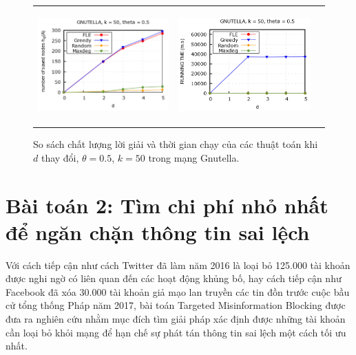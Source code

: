 \begin{figure}[H]
	\begin{tabular}{lll}
		\includegraphics[height = 4.4cm]{picture/FLE/gnu_res_d} &
		\includegraphics[height = 4.4cm]{picture/FLE/gnu_time_d}
	\end{tabular}
	\caption{So sách chất lượng lời giải và thời gian chạy của các thuật toán khi $d$ thay đổi, $\theta=0.5$, $k=50$ trong mạng Gnutella.} 
	\label{fig:FLE_d}   
\end{figure} 







\section{Bài toán 2: Tìm chi phí nhỏ nhất để ngăn chặn thông tin sai lệch}

Với cách tiếp cận như cách Twitter đã làm năm 2016 là loại bỏ 125.000 tài khoản được nghi ngờ có liên quan đến các hoạt động khủng bố, hay cách tiếp cận như Facebook đã xóa 30.000 tài khoản giả mạo lan truyền các tin đồn trước cuộc bầu cử tổng thống Pháp năm 2017, bài toán Targeted Misinformation Blocking được đưa ra nghiên cứu nhằm mục đích tìm giải pháp xác định được những tài khoản cần loại bỏ khỏi mạng để hạn chế sự phát tán thông tin sai lệch một cách tối ưu nhất.

